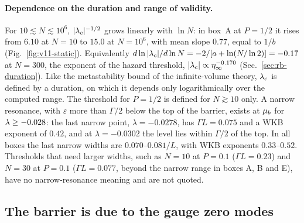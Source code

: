 \paragraph{Dependence on the duration and range of validity.}
For $10\lesssim N\lesssim10^6$, $|\lambda_c|^{-1/2}$ grows linearly with $\ln N$: in box~A at $P=1/2$ it rises from $6.10$ at $N=10$ to $15.0$ at $N=10^6$, with mean slope $0.77$, equal to $1/b$ (Fig.~\ref{fig:v11-static}). %
Equivalently $d\ln|\lambda_c|/d\ln N=-2/[a+\ln(N/\ln2)]=-0.17$ at $N=300$, the exponent of the hazard threshold, $|\lambda_c|\propto\eta_\infty^{-0.170}$ (Sec.~\ref{sec:rb-duration}). %
Like the metastability bound of the infinite-volume theory, $\lambda_c$ is defined by a duration, on which it depends only logarithmically over the computed range.
The threshold for $P=1/2$ is defined for $N\gtrsim10$ only.
A narrow resonance, with $\varepsilon$ more than $\Gamma/2$ below the top of the barrier, exists at $\mu_b$ for $\lambda\ge-0.028$: the last narrow point, $\lambda=-0.0278$, has $\Gamma L=0.075$ and a WKB exponent of $0.42$, and at $\lambda=-0.0302$ the level lies within $\Gamma/2$ of the top. %
In all boxes the last narrow widths are $0.070$--$0.081/L$, with WKB exponents $0.33$--$0.52$. %
Thresholds that need larger widths, such as $N=10$ at $P=0.1$ ($\Gamma L=0.23$) and $N=30$ at $P=0.1$ ($\Gamma L=0.077$, beyond the narrow range in boxes A, B and E), have no narrow-resonance meaning and are not quoted. %

\subsection{The barrier is due to the gauge zero modes}
\label{sec:v11-kappa}

